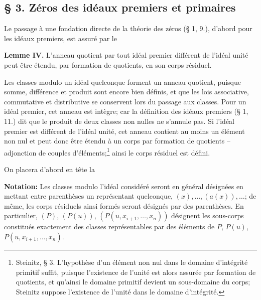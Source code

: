 \providecommand{\frakS}{\mathfrak S}
\providecommand{\fraka}{\mathfrak a}
\providecommand{\frakg}{\mathfrak g}
\providecommand{\frakp}{\mathfrak p}
\providecommand{\frakq}{\mathfrak q}

\subsection*{\S{} 3. Zéros des idéaux premiers et primaires}

Le passage à une fondation directe de la théorie des zéros (\S{} 1, 9.), d'abord pour les idéaux premiers, est assuré par le

\textbf{Lemme IV.} L'anneau quotient par tout idéal premier différent de l'idéal unité peut être étendu, par formation de quotients, en son corps résiduel.

Les classes modulo un idéal quelconque forment un anneau quotient, puisque somme, différence et produit sont encore bien définis, et que les lois associative, commutative et distributive se conservent lors du passage aux classes. Pour un idéal premier, cet anneau est intègre; car la définition des idéaux premiers (\S{} 1, 11.) dit que le produit de deux classes non nulles ne s'annule pas. Si l'idéal premier est différent de l'idéal unité, cet anneau contient au moins un élément non nul et peut donc être étendu à un corps par formation de quotients -- adjonction de couples d'éléments;\footnote{Steinitz, \S{} 3. L'hypothèse d'un élément non nul dans le domaine d'intégrité primitif suffit, puisque l'existence de l'unité est alors assurée par formation de quotients, et qu'ainsi le domaine primitif devient un sous-domaine du corps; Steinitz suppose l'existence de l'unité dans le domaine d'intégrité.} ainsi le corps résiduel est défini.

On placera d'abord en tête la

\textbf{Notation:} Les classes modulo l'idéal considéré seront en général désignées en mettant entre parenthèses un représentant quelconque, $(x),\ldots,(a(x)),\ldots$; de même, les corps résiduels ainsi formés seront désignés par des parenthèses. En particulier, $(P)$, $(P(u))$, $(P(u,x_{i+1},\ldots,x_n))$ désignent les sous-corps constitués exactement des classes représentables par des éléments de $P$, $P(u)$, $P(u,x_{i+1},\ldots,x_n)$.

